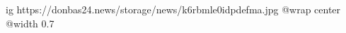  
 
 
 
 

\ifcmt
  ig https://donbas24.news/storage/news/k6rbmle0idpdefma.jpg
  @wrap center
  @width 0.7
\fi
